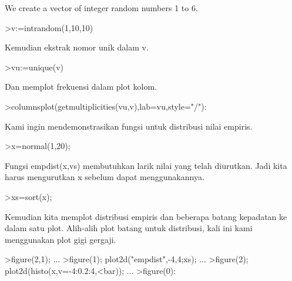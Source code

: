 \documentclass[12pt,Times new roman,letterpaper]{book}
\begin{document}
\begin{eulernootebook}
\begin{eulercomment}
\begin{eulercomment}
\begin{eulernootebook}
\begin{eulercomment}
\begin{eulercomment}
\begin{eulercomment}
\begin{eulercomment}
\begin{eulercomment}
\begin{eulercomment}
\begin{eulercomment}
\begin{eulercomment}
We create a vector of integer random numbers 1 to 6.
\end{eulercomment}
\begin{eulerprompt}
>v:=intrandom(1,10,10)
\end{eulerprompt}
\begin{euleroutput}
  [8,  5,  8,  8,  6,  8,  8,  3,  5,  5]
\end{euleroutput}
\begin{eulercomment}
Kemudian ekstrak nomor unik dalam v.
\end{eulercomment}
\begin{eulerprompt}
>vu:=unique(v)
\end{eulerprompt}
\begin{euleroutput}
  [3,  5,  6,  8]
\end{euleroutput}
\begin{eulercomment}
Dan memplot frekuensi dalam plot kolom.
\end{eulercomment}
\begin{eulerprompt}
>columnsplot(getmultiplicities(vu,v),lab=vu,style="/"):
\end{eulerprompt}
\begin{eulercomment}
Kami ingin mendemonstrasikan fungsi untuk distribusi nilai empiris.
\end{eulercomment}
\begin{eulerprompt}
>x=normal(1,20);
\end{eulerprompt}
\begin{eulercomment}
Fungsi empdist(x,vs) membutuhkan larik nilai yang telah diurutkan.
Jadi kita harus mengurutkan x sebelum dapat menggunakannya.
\end{eulercomment}
\begin{eulerprompt}
>xs=sort(x);
\end{eulerprompt}
\begin{eulercomment}
Kemudian kita memplot distribusi empiris dan beberapa batang kepadatan
ke dalam satu plot. Alih-alih plot batang untuk distribusi, kali ini
kami menggunakan plot gigi gergaji.
\end{eulercomment}
\begin{eulerprompt}
>figure(2,1); ...
>figure(1); plot2d("empdist",-4,4;xs); ...
>figure(2); plot2d(histo(x,v=-4:0.2:4,<bar));  ...
>figure(0):
\end{eulerprompt}

\end{eulercomment}
\end{eulercomment}
\end{eulercomment}
\end{eulercomment}
\end{eulercomment}
\end{eulercomment}
\end{eulercomment}
\end{eulernootebook}
\end{eulercomment}
\end{eulercomment}
\end{eulernootebook}
\end{document}
